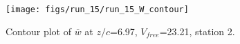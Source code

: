 \begin{figure}[H]
\centering
\texttt{[image: figs/run\_15/run\_15\_W\_contour]}
\caption{Contour plot of $\overline{w}$ at $z/c$=6.97, $V_{free}$=23.21, station 2.}
\label{fig:run_15_W_contour}
\end{figure}


